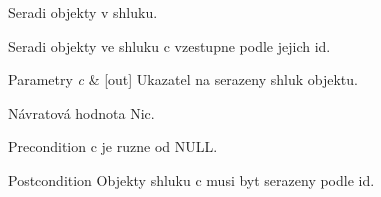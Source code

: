 Seradi objekty v shluku. 

Seradi objekty ve shluku \textquotesingle{}c\textquotesingle{} vzestupne podle jejich \textquotesingle{}id\textquotesingle{}.


\begin{DoxyParams}{Parametry}
{\em c} & \mbox{[}out\mbox{]} Ukazatel na serazeny shluk objektu. \\
\hline
\end{DoxyParams}
\begin{DoxyReturn}{Návratová hodnota}
Nic.
\end{DoxyReturn}
\begin{DoxyPrecond}{Precondition}
\textquotesingle{}c\textquotesingle{} je ruzne od \textquotesingle{}N\+U\+LL\textquotesingle{}. 
\end{DoxyPrecond}
\begin{DoxyPostcond}{Postcondition}
Objekty shluku \textquotesingle{}c\textquotesingle{} musi byt serazeny podle \textquotesingle{}id\textquotesingle{}. 
\end{DoxyPostcond}
